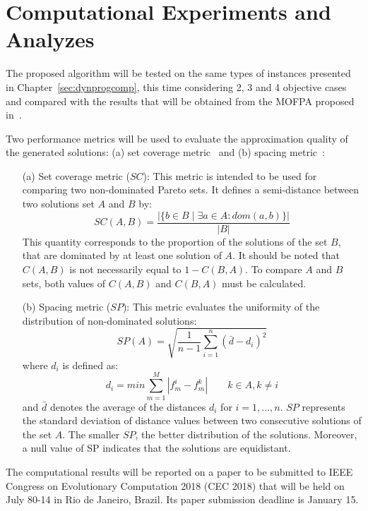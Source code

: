 \section{Computational Experiments and Analyzes}
The proposed algorithm will be tested on the same types
of instances presented  in Chapter~\ref{sec:dynprogcomp},
this time considering 2, 3 and 4 objective cases
and compared with the results that will be obtained from
the MOFPA proposed in~\cite{zouache2018cooperative}.

Two performance metrics will be used to evaluate the
approximation quality of the generated solutions:
(a) set coverage metric~\cite{zitzler1998multiobjective}
and (b) spacing metric~\cite{schott1995fault}:
\begin{itemize}
  \item[(a)]{Set coverage metric ($SC$):
  This metric is intended to be used for comparing
    two non-dominated Pareto sets.
    It defines a semi-distance between two solutions set $A$ and $B$ by:
    \begin{displaymath}
      SC(A, B) = \frac{\big|\{ b \in B
        \;|\; \exists a \in A : dom(a, b)\}\big|}{|B|}
    \end{displaymath}
    This quantity corresponds to the proportion of the solutions
    of the set $B$, that are dominated by at least one solution
    of $A$. It should be noted that $C(A,B)$ is not necessarily
    equal to $1-C(B, A)$. To compare $A$ and $B$ sets, both values
    of  $C(A,B)$ and $C(B,A)$ must be calculated.}
  \item[(b)]{Spacing metric ($SP$): This metric evaluates the uniformity
    of the distribution of non-dominated solutions:
    \begin{displaymath}
      SP(A) = \sqrt{\frac{1}{n-1} \sum^n_{i=1} (\bar{d}-d_i)^2}
    \end{displaymath}
    where $d_i$ is defined as:
    \begin{displaymath}
     d_i = min \sum^M_{m=1} | f^i_m - f^k_m | \qquad k \in A, k \neq i
    \end{displaymath}
    and $\bar{d}$ denotes the average of the distances $d_i$ for
    $i = 1, \ldots, n$.
    $SP$ represents the standard deviation of distance values between
    two consecutive solutions of the set $A$.
    The smaller $SP$, the better distribution of the solutions.
    Moreover, a null value of SP indicates that the solutions are
    equidistant. }
\end{itemize}

The computational results will be reported on a paper to be submitted
to IEEE Congress on Evolutionary Computation 2018 (CEC 2018) that
will be held on July 80-14 in Rio de Janeiro, Brazil.
Its paper submission deadline is January 15.

